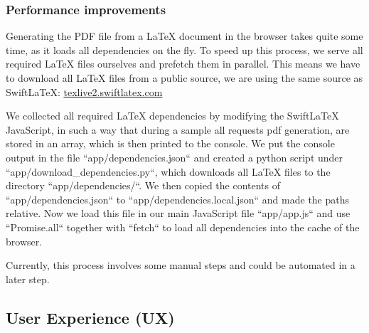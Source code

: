 \subsubsection{Performance improvements}
Generating the PDF file from a LaTeX document in the browser takes quite some time, as it loads all dependencies
on the fly.
To speed up this process, we serve all required LaTeX files ourselves and prefetch them in parallel.
This means we have to download all LaTeX files from a public source, we are using the same source as SwiftLaTeX:
\href{https://texlive2.swiftlatex.com/}{texlive2.swiftlatex.com}

We collected all required LaTeX dependencies by modifying the SwiftLaTeX JavaScript, in such a way that during a sample
all requests pdf generation, are stored in an array, which is then printed to the console.
We put the console output in the file ``app/dependencies.json`` and created a python script under ``app/download\_dependencies.py``,
which downloads all LaTeX files to the directory ``app/dependencies/``.
We then copied the contents of ``app/dependencies.json`` to ``app/dependencies.local.json`` and made the paths relative.
Now we load this file in our main JavaScript file ``app/app.js`` and use ``Promise.all`` together with ``fetch`` to load
all dependencies into the cache of the browser.

Currently, this process involves some manual steps and could be automated in a later step.

\subsection{User Experience (UX)}\label{subsec:ux}
